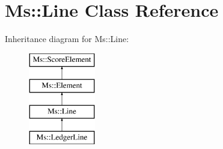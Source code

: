 \hypertarget{class_ms_1_1_line}{}\section{Ms\+:\+:Line Class Reference}
\label{class_ms_1_1_line}
Inheritance diagram for Ms\+:\+:Line\+:\begin{figure}[H]
\begin{center}
\leavevmode
\includegraphics[height=4.000000cm]{class_ms_1_1_line}
\end{center}
\end{figure}
